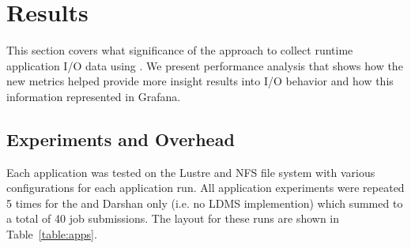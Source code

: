 \section{Results}
\label{sec:results}

This section covers what significance of the approach to collect
runtime application I/O data using \Darshan{}. We present performance
analysis that shows how the new metrics helped provide more insight
results into I/O behavior and how this information represented
in Grafana.

\subsection{Experiments and Overhead}
Each application was tested on the Lustre and NFS file system with various configurations for each application run. All application experiments were repeated 5 times for the \connector{} and Darshan only (i.e. no LDMS implemention) which summed to a total of 40 job submissions. The layout for these runs are shown in Table~\ref{table:apps}.  

